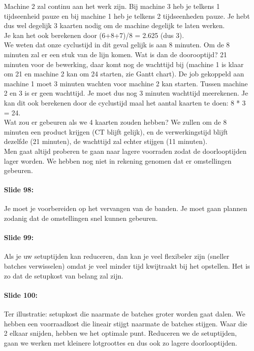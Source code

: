 \documentclass[10pt,a4paper]{report}
\begin{document}
Machine 2 zal continu aan het werk zijn. Bij machine 3 heb je telkens 1 tijdseenheid pauze en bij machine 1 heb je telkens 2 tijdseenheden pauze. Je hebt dus wel degelijk 3 kaarten nodig om de machine degelijk te laten werken.\\
Je kan het ook berekenen door (6+8+7)/8 = 2.625 (dus 3).\\
We weten dat onze cyclustijd in dit geval gelijk is aan 8 minuten. Om de 8 minuten zal er een stuk van de lijn komen. Wat is dan de doorooptijd? 21 minuten voor de bewerking, daar komt nog de wachttijd bij (machine 1 is klaar om 21 en machine 2 kan om 24 starten, zie Gantt chart). De job gekoppeld aan machine 1 moet 3 minuten wachten voor machine 2 kan starten. Tussen machine 2 en 3 is er geen wachttijd. Je moet dus nog 3 minuten wachttijd meerekenen. Je kan dit ook berekenen door de cyclustijd maal het aantal kaarten te doen: 8 * 3 = 24.\\
Wat zou er gebeuren als we 4 kaarten zouden hebben? We zullen om de 8 minuten een product krijgen (CT blijft gelijk), en de verwerkingstijd blijft dezelfde (21 minuten), de wachttijd zal echter stijgen (11 minuten).\\ 
Men gaat altijd proberen te gaan naar lagere voorraden zodat de doorlooptijden lager worden. 
We hebben nog niet in rekening genomen dat er omstellingen gebeuren.

\paragraph{Slide 98:} Je moet je voorbereiden op het vervangen van de banden. Je moet gaan plannen zodanig dat de omstellingen snel kunnen gebeuren.

\paragraph{Slide 99:} Als je uw setuptijden kan reduceren, dan kan je veel flexibeler zijn (sneller batches verwisselen) omdat je veel minder tijd kwijtraakt bij het opstellen. 
Het is zo dat de setupkost van belang zal zijn. 

\paragraph{Slide 100:} Ter illustratie: setupkost die naarmate de batches groter worden gaat dalen. We hebben een voorraadkost die lineair stijgt naarmate de batches stijgen. Waar die 2 elkaar snijden, hebben we het optimale punt. Reduceren we de setuptijden, gaan we werken met kleinere lotgroottes en dus ook zo lagere doorlooptijden. 
\end{document}
